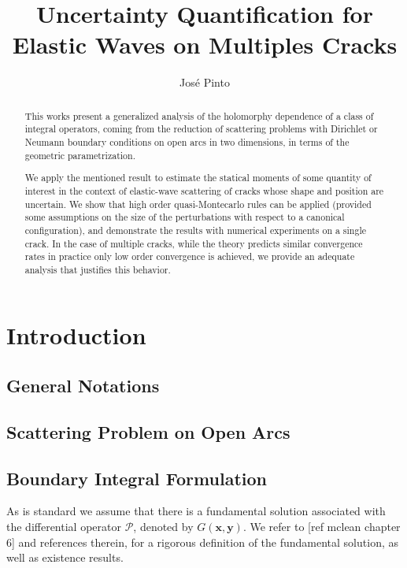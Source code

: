 \documentclass{article}
\title{Uncertainty Quantification for Elastic Waves on Multiples Cracks}
\author{Jos\'e Pinto}
\newcommand{\vx}{\bm{x}}
\newcommand{\todo}[1]{{\color{red}[#1]}}
\newcommand{\cP}{\mathcal{P}}
\newcommand{\by}{\bm{y}}
\begin{document}
\maketitle

\begin{abstract}
This works present a generalized analysis of the holomorphy dependence of a class of integral operators, coming from the reduction of scattering problems with Dirichlet or Neumann boundary conditions on open arcs in two dimensions,  in terms of the geometric parametrization. 

We apply the mentioned result to estimate the statical moments of some quantity of interest in the context of elastic-wave scattering of cracks whose shape and position are uncertain. We show that high order quasi-Montecarlo rules can be applied (provided some assumptions on the size of the perturbations with respect to a canonical configuration), and demonstrate the results with numerical experiments on a single crack. In the case of multiple cracks, while the theory predicts similar convergence rates in practice only low order convergence is achieved, we provide an adequate analysis that justifies this behavior. 
\end{abstract}

\section{Introduction}
\subsection{General Notations}
\subsection{Scattering Problem on Open Arcs}
\subsection{Boundary Integral Formulation}

As is standard we assume that there is a fundamental solution associated with the differential operator $\cP$, denoted by $G(\vx,\by)$. We refer to \todo{ref mclean chapter 6} and references therein, for a rigorous definition of the fundamental solution, as well as existence results.
\end{document}
